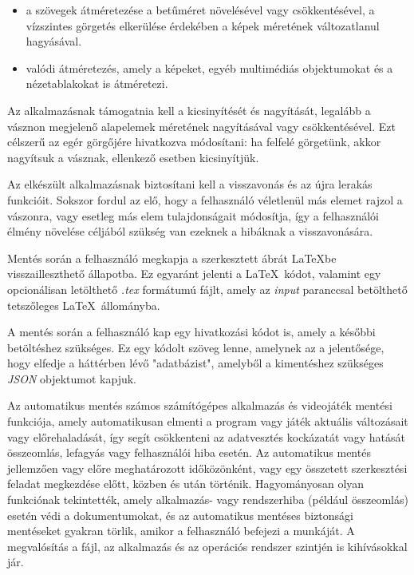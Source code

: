 \begin{itemize}
	\item a szövegek átméretezése a betűméret növelésével vagy csökkentésével, a vízszintes görgetés elkerülése érdekében a képek méretének változatlanul hagyásával.
	\item valódi átméretezés, amely a képeket, egyéb multimédiás objektumokat és a nézetablakokat is átméretezi.
\end{itemize}

Az alkalmazásnak támogatnia kell a kicsinyítését és nagyítását, legalább a vásznon megjelenő alapelemek méretének nagyításával vagy csökkentésével. Ezt célszerű az egér görgőjére hivatkozva módosítani: ha felfelé görgetünk, akkor nagyítsuk a vásznak, ellenkező esetben kicsinyítjük.


Az elkészült alkalmazásnak biztosítani kell a visszavonás és az újra lerakás funkcióit. Sokszor fordul az elő, hogy a felhasználó véletlenül más elemet rajzol a vászonra, vagy esetleg más elem tulajdonságait módosítja, így a felhasználói élmény növelése céljából szükség van ezeknek a hibáknak a visszavonására.



Mentés során a felhasználó megkapja a szerkesztett ábrát \LaTeX\-be visszailleszthető állapotba. Ez egyaránt jelenti a \LaTeX\ kódot, valamint egy opcionálisan letölthető \textit{.tex} formátumú fájlt, amely az \textit{input} paranccsal betölthető tetszőleges \LaTeX\ állományba.

A mentés során a felhasználó kap egy hivatkozási kódot is, amely a későbbi betöltéshez szükséges. Ez egy kódolt szöveg lenne, amelynek az a jelentősége, hogy elfedje a háttérben lévő "adatbázist", amelyből a kimentéshez szükséges \textit{JSON} objektumot kapjuk.


Az automatikus mentés számos számítógépes alkalmazás és videojáték mentési funkciója, amely automatikusan elmenti a program vagy játék aktuális változásait vagy előrehaladását, így segít csökkenteni az adatvesztés kockázatát vagy hatását összeomlás, lefagyás vagy felhasználói hiba esetén. Az automatikus mentés jellemzően vagy előre meghatározott időközönként, vagy egy összetett szerkesztési feladat megkezdése előtt, közben és után történik. Hagyományosan olyan funkciónak tekintették, amely alkalmazás- vagy rendszerhiba (például összeomlás) esetén védi a dokumentumokat, és az automatikus mentéses biztonsági mentéseket gyakran törlik, amikor a felhasználó befejezi a munkáját. A megvalósítás a fájl, az alkalmazás és az operációs rendszer szintjén is kihívásokkal jár.


